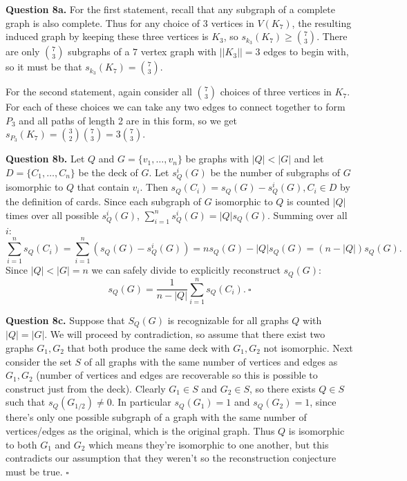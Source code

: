 \documentclass[letterpaper, reqno,11pt]{article}
\begin{document}
{\medskip\noindent\bf Question 8a.} For the first statement, recall that any subgraph of a complete graph is also complete. Thus for any choice of $3$ vertices in $V(K_{7})$, the resulting induced graph by keeping these three vertices is $K_{3}$, so $s_{k_{3}}(K_{7})\geq {7\choose 3}$. There are only ${7\choose 3}$ subgraphs of a $7$ vertex graph with $||K_{3}| |=3$ edges to begin with, so it must be that $s_{k_{3}}(K_{7})={7\choose 3}$. 

For the second statement, again consider all ${7\choose 3}$ choices of three vertices in $K_{7}$. For each of these choices we can take any two edges to connect together to form $P_{3}$ and all paths of length 2 are in this form, so we get $s_{P_{3}}(K_{7})={3\choose 2}{7\choose 3}=3{7\choose 3}$. 

{\medskip\noindent\bf Question 8b.} Let $Q$ and $G=\{v_{1}, \ldots, v_{n}\} $ be graphs with $|Q|<|G|$ and let $D=\{C_1,\ldots,C_n\} $ be the deck of $G$. Let $s^{i}_Q(G)$ be the number of subgraphs of $G$ isomorphic to $Q$ that contain $v_{i}$. Then $s_{Q}(C_i)=s_{Q}(G)-s^{i}_{Q}(G), C_i\in D$ by the definition of cards. Since each subgraph of $G$ isomorphic to $Q$ is counted $|Q|$ times over all possible $s^{i}_{Q}(G)$, $\sum_{i=1}^{n}s^{i}_{Q}(G)=|Q| s_{Q}(G)$. Summing over all $i$: 
\[
\sum_{i=1}^{n}s_{Q}(C_{i})=\sum_{i=1}^{n}(s_{Q}(G)-s^{i}_{Q}(G))=ns_{Q}(G)-|Q|s_{Q}(G)=(n-|Q|)s_{Q}(G)
.\]
Since $|Q|<|G|=n$ we can safely divide to explicitly reconstruct $s_{Q}(G)$:
\[
s_{Q}(G)=\frac{1}{n-|Q|}\sum_{i=1}^{n}s_{Q}(C_i)
.\ \square\]

{\medskip\noindent\bf Question 8c.} Suppose that $S_{Q}(G)$ is recognizable for all graphs $Q$ with $|Q|=|G|$. We will proceed by contradiction, so assume that there exist two graphs $G_1,G_2$ that both produce the same deck with $G_1,G_2$ not isomorphic. Next consider the set $S$ of all graphs with the same number of vertices and edges as $G_1,G_2$ (number of vertices and edges are recoverable so this is possible to construct just from the deck). Clearly $G_1\in S$ and $G_2\in S$, so there exists $Q\in S$ such that $s_{Q}(G_{1 /2})\neq 0$. In particular $s_{Q}(G_{1})=1$ and $s_{Q}(G_{2})=1$, since there's only one possible subgraph of a graph with the same number of vertices/edges as the original, which is the original graph. Thus $Q$ is isomorphic to both $G_1$ and $G_2$ which means they're isomorphic to one another, but this contradicts our assumption that they weren't so the reconstruction conjecture must be true. $\square$
\end{document}
